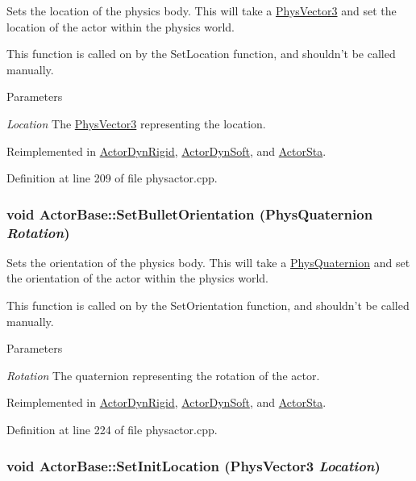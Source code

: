 Sets the location of the physics body. This will take a \hyperlink{classPhysVector3}{PhysVector3} and set the location of the actor within the physics world. \par
 This function is called on by the SetLocation function, and shouldn't be called manually. 
\begin{DoxyParams}{Parameters}
\item[{\em Location}]The \hyperlink{classPhysVector3}{PhysVector3} representing the location. \end{DoxyParams}


Reimplemented in \hyperlink{classActorDynRigid_a3f0720ca18d04a1084207d474c3d7834}{ActorDynRigid}, \hyperlink{classActorDynSoft_aaf548f7849f59956c10d79420efafffb}{ActorDynSoft}, and \hyperlink{classActorSta_a472768e39d3ac67f35b9f74e5a679b99}{ActorSta}.

Definition at line 209 of file physactor.cpp.\hypertarget{classActorBase_adf817bd5a7c562f31f6724a06a3a0f79}{
\subsubsection[{SetBulletOrientation}]{\setlength{\rightskip}{0pt plus 5cm}void ActorBase::SetBulletOrientation ({\bf PhysQuaternion} {\em Rotation})}}
\label{dd/d7b/classActorBase_adf817bd5a7c562f31f6724a06a3a0f79}


Sets the orientation of the physics body. This will take a \hyperlink{classPhysQuaternion}{PhysQuaternion} and set the orientation of the actor within the physics world. \par
 This function is called on by the SetOrientation function, and shouldn't be called manually. 
\begin{DoxyParams}{Parameters}
\item[{\em Rotation}]The quaternion representing the rotation of the actor. \end{DoxyParams}


Reimplemented in \hyperlink{classActorDynRigid_ae471894081ae956dd79844a2f14fb1d9}{ActorDynRigid}, \hyperlink{classActorDynSoft_abbb2c795bd07b014239f157b440bc53d}{ActorDynSoft}, and \hyperlink{classActorSta_ab038b2ce4e25fa3441e9b081cef7879e}{ActorSta}.

Definition at line 224 of file physactor.cpp.\hypertarget{classActorBase_ac118fc21f89d067d987d511b444f7d55}{
\subsubsection[{SetInitLocation}]{\setlength{\rightskip}{0pt plus 5cm}void ActorBase::SetInitLocation ({\bf PhysVector3} {\em Location})}}
\label{dd/d7b/classActorBase_ac118fc21f89d067d987d511b444f7d55}


